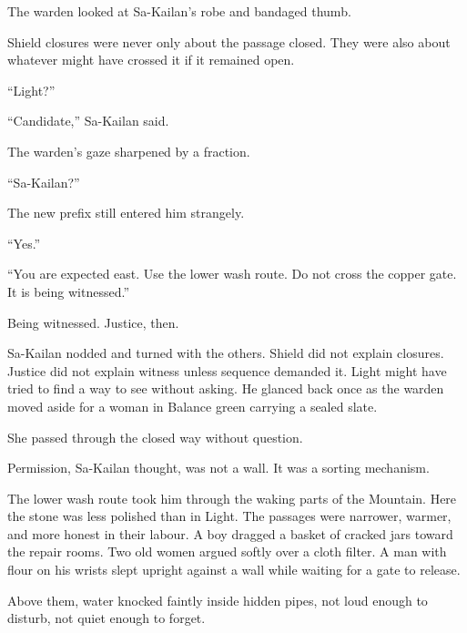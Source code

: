 The warden looked at Sa-Kailan’s robe and bandaged thumb.\par

Shield closures were never only about the passage closed.
They were also about whatever might have crossed it if it remained open.\par

“Light?”\par

“Candidate,” Sa-Kailan said.\par

The warden’s gaze sharpened by a fraction.\par

“Sa-Kailan?”\par

The new prefix still entered him strangely.\par

“Yes.”\par

“You are expected east.
Use the lower wash route.
Do not cross the copper gate.
It is being witnessed.”\par

Being witnessed.
Justice, then.\par

Sa-Kailan nodded and turned with the others.
Shield did not explain closures.
Justice did not explain witness unless sequence demanded it.
Light might have tried to find a way to see without asking.
He glanced back once as the warden moved aside for a woman in Balance green carrying a sealed slate.\par

She passed through the closed way without question.\par

Permission, Sa-Kailan thought, was not a wall.
It was a sorting mechanism.\par

The lower wash route took him through the waking parts of the Mountain.
Here the stone was less polished than in Light.
The passages were narrower, warmer, and more honest in their labour.
A boy dragged a basket of cracked jars toward the repair rooms.
Two old women argued softly over a cloth filter.
A man with flour on his wrists slept upright against a wall while waiting for a gate to release.\par

Above them, water knocked faintly inside hidden pipes, not loud enough to disturb, not quiet enough to forget.\par

